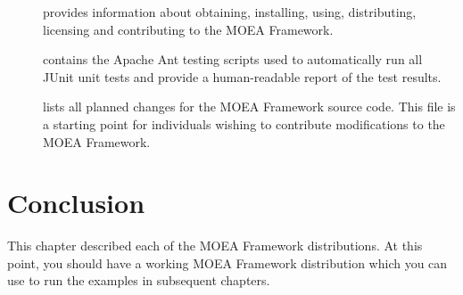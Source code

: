\begin{description}
  \item[] provides information about obtaining, installing, using, distributing, licensing and contributing to the MOEA Framework.
  \item[] contains the Apache Ant testing scripts used to automatically run all JUnit unit tests and provide a human-readable report of the test results.
  \item[] lists all planned changes for the MOEA Framework source code.  This file is a starting point for individuals wishing to contribute modifications to the MOEA Framework.
\end{description}

\section{Conclusion}
This chapter described each of the MOEA Framework distributions.  At this point, you should have a working MOEA Framework distribution which you can use to run the examples in subsequent chapters.